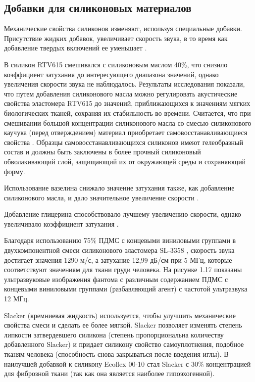 \subsection {Добавки для силиконовых материалов}

Механические свойства силиконов изменяют, используя специальные добавки. Присутствие жидких добавок, увеличивает скорость звука, в то время как добавление твердых включений ее уменьшает \cite{litlink57}.

В \cite{litlink46} силикон RTV615 смешивался с силиконовым маслом 40\%, что снизило коэффициент затухания до интересующего диапазона значений, однако увеличения скорости звука не наблюдалось. Результаты исследования \cite{litlink46} показали, что путем добавления силиконового масла можно регулировать акустические свойства эластомера RTV615 до значений, приближающихся к значениям мягких биологических тканей, сохраняя их стабильность во времени. Считается, что при смешивании большой концентрации силиконового масла со смесью силиконового каучука (перед отверждением) материал приобретает самовосстанавливающиеся свойства \cite{litlink60}. Образцы самовосстанавливающихся силиконов имеют гелеобразный состав и должны быть заключены в более прочный силиконовый обволакивающий слой, защищающий их от окружающей среды и сохраняющий форму.  

Использование вазелина снижало значение затухания также, как добавление силиконового масла, и дало значительное увеличение скорости \cite{litlink46}. 
 
Добавление глицерина способствовало лучшему увеличению скорости, однако увеличивало коэффициент затухания \cite{litlink46}.

Благодаря использованию 75\% ПДМС с концевыми виниловыми группами в двухкомпонентной смеси силиконового эластомера SL-3358 \cite{litlink58}, скорость звука достигает значения 1290 м/с, а затухание 12,99 дБ/см при 5 МГц, которые соответствуют значениям для ткани груди человека. На рисунке 1.17 показаны ультразвуковые изображения фантома с различным содержанием ПДМС с концевыми виниловыми группами (разбавляющий агент) с частотой ультразвука 12 МГц.

Slacker (кремниевая жидкость) используется, чтобы улучшить механические свойства смеси и сделать ее более мягкой. Slacker позволяет изменять степень липкости затвердевшего силикона (степень пропорциональна количеству добавленного Slacker) и придает силикону свойство самоуплотнения, подобное тканям человека (способность снова закрываться после введения иглы). В \cite{litlink59} наилучшей добавкой к силикону Ecoflex 00-10 стал Slacker с 30\% концентрацией для фиброзной ткани (так как она является наиболее гипоэхогенной). 

